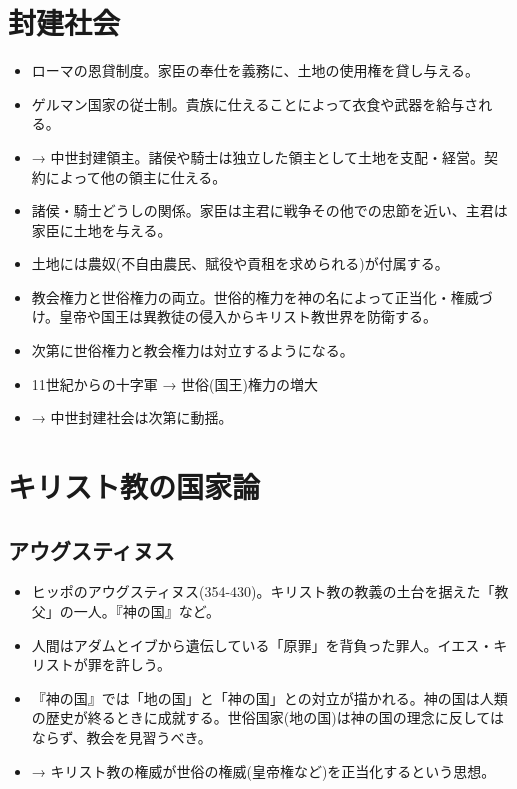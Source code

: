 \documentclass[uplatex,dvipdfmx]{jsarticle} \usepackage{mystyle}%
\begin{document}
\section{封建社会}

\begin{itemize}
\item ローマの恩貸制度。家臣の奉仕を義務に、土地の使用権を貸し与える。
\item ゲルマン国家の従士制。貴族に仕えることによって衣食や武器を給与される。
\item → 中世封建領主。諸侯や騎士は独立した領主として土地を支配・経営。契約によって他の領主に仕える。
\item 諸侯・騎士どうしの関係。家臣は主君に戦争その他での忠節を近い、主君は家臣に土地を与える。
\item 土地には農奴(不自由農民、賦役や貢租を求められる)が付属する。
\item 教会権力と世俗権力の両立。世俗的権力を神の名によって正当化・権威づけ。皇帝や国王は異教徒の侵入からキリスト教世界を防衛する。
\item 次第に世俗権力と教会権力は対立するようになる。
\item 11世紀からの十字軍 → 世俗(国王)権力の増大
\item → 中世封建社会は次第に動揺。
\end{itemize}



\section{キリスト教の国家論}

\subsection{アウグスティヌス}

\begin{itemize}
\item ヒッポのアウグスティヌス(354-430)。キリスト教の教義の土台を据えた「教父」の一人。『神の国』など。
\item 人間はアダムとイブから遺伝している「原罪」を背負った罪人。イエス・キリストが罪を許しう。
\item 『神の国』では「地の国」と「神の国」との対立が描かれる。神の国は人類の歴史が終るときに成就する。世俗国家(地の国)は神の国の理念に反してはならず、教会を見習うべき。
\item → キリスト教の権威が世俗の権威(皇帝権など)を正当化するという思想。

\end{itemize}
\end{document}
